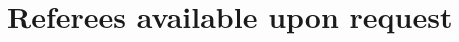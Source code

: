 \documentclass[11pt,a4paper,sans]{moderncv} %
\begin{document}
\section{Referees available upon request}
















\end{document}
